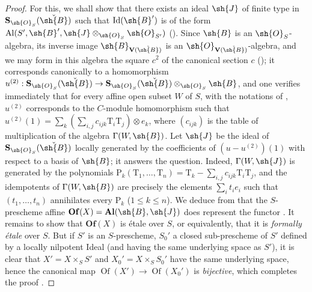 \begin{proof}
For this, we shall show that there exists an ideal $\sh{J}$ of finite type in $\mathbf{S}_{\sh{O}_S}(\check{\sh{B}})$ such that $\operatorname{Id}(\sh{B}')$ is of the form $\mathrm{Al}(S',\sh{B}',\sh{J}\otimes_{\sh{O}_S}\sh{O}_{S'})$ ().
Since $\sh{B}$ is an $\sh{O}_S$-algebra, its inverse image $\sh{B}_{\mathbf{V}(\check{\sh{B}})}$ is an $\sh{O}_{\mathbf{V}(\check{\sh{B}})}$-algebra, and we may form in this algebra the square $c^2$ of the canonical section $c$ ();
it corresponds canonically to a homomorphism $u^{(2)}:\mathbf{S}_{\sh{O}_S}(\check{\sh{B}})\to\mathbf{S}_{\sh{O}_S}(\check{\sh{B}})\otimes_{\sh{O}_S}\sh{B}$, and one verifies immediately that for every affine open subset $W$ of $S$, with the notations of , $u^{(2)}$ corresponds to the $C$-module homomorphism such that $u^{(2)}(1)=\sum_k(\sum_{i,j}c_{ijk}\mathrm{T}_i\mathrm{T}_j)\otimes e_k$, where $(c_{ijk})$ is the table of multiplication of the algebra $\Gamma(W,\sh{B})$.
Let $\sh{J}$ be the ideal of $\mathbf{S}_{\sh{O}_S}(\check{\sh{B}})$ locally generated by the coefficients of $(u-u^{(2)})(1)$ with respect to a basis of $\sh{B}$; it answers the question.
Indeed, $\Gamma(W,\sh{J})$ is generated by the polynomials $\mathrm{P}_k(\mathrm{T}_1,\ldots,\mathrm{T}_n)=\mathrm{T}_k-\sum_{i,j}c_{ijk}\mathrm{T}_i\mathrm{T}_j$, and the idempotents of $\Gamma(W,\sh{B})$ are precisely the elements $\sum_i t_i e_i$ such that $(t_1,\ldots,t_n)$ annihilates every $\mathrm{P}_k$ ($1\leq k\leq n$).
We deduce from  that the $S$-prescheme affine $\mathbf{Of}(X)=\mathbf{Al}(\sh{B},\sh{J})$ does represent the functor .
It remains to show that $\mathbf{Of}(X)$ is \'etale over $S$, or equivalently, that it is \emph{formally \'etale} over $S$.
But if $S'$ is an $S$-prescheme, $S_0'$ a closed sub-prescheme of $S'$ defined by a locally nilpotent Ideal (and having the same underlying space as $S'$), it is clear that $X'=X\times_S S'$ and $X_0'=X\times_S S_0'$ have the same underlying space, hence the canonical map $\operatorname{Of}(X')\to\operatorname{Of}(X_0')$ is \emph{bijective}, which completes the proof .
\end{proof}

